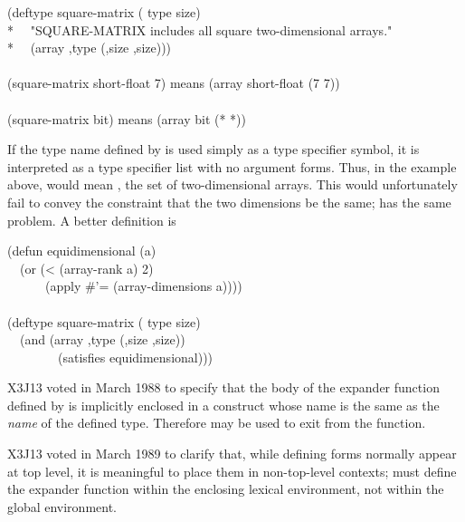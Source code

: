 \begin{defmac}
\begin{lisp}
(deftype square-matrix ( type size) \\*
~~"SQUARE-MATRIX includes all square two-dimensional arrays." \\*
~~{\Xbq}(array ,type (,size ,size))) \\
 \\
(square-matrix short-float 7)  {\rm means}  (array short-float (7 7)) \\
 \\
(square-matrix bit)  {\rm means}  (array bit (* *))
\end{lisp}
If the type name defined by  is used simply as a type
specifier symbol, it is interpreted as a type specifier list with
no argument forms.  Thus, in the example above, 
would mean , the set of two-dimensional arrays.
This would unfortunately fail to convey the constraint that the two
dimensions be the same;  has the same problem.
A better definition is
\begin{lisp}
(defun equidimensional (a) \\
~~(or (< (array-rank a) 2) \\
~~~~~~(apply \#'= (array-dimensions a)))) \\
 \\
(deftype square-matrix ( type size) \\
~~{\Xbq}(and (array ,type (,size ,size)) \\
~~~~~~~~(satisfies equidimensional)))
\end{lisp}

\begin{newer}
X3J13 voted in March 1988 
to specify that the body of the expander function defined
by  is implicitly enclosed in a  construct
whose name is the same as the {\it name} of the defined type.
Therefore  may be used to exit from the function.
\end{newer}

\begin{newer}
X3J13 voted in March 1989 
to clarify that, while defining forms normally appear at top level,
it is meaningful to place them in non-top-level contexts;
 must define the expander function
within the enclosing lexical environment, not within the global
environment.
\end{newer}

\end{defmac}

